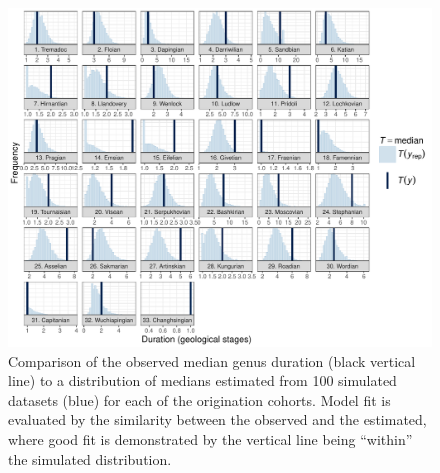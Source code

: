 \documentclass[11pt]{article}
\begin{document}
\begin{figure}[ht]
  \centering
  \includegraphics[height = 0.5\textheight,width=\textwidth,keepaspectratio=true]{figure/ppc_med_group_cweib_cens}
  \caption{ Comparison of the observed median genus duration (black vertical line) to a distribution of medians estimated from 100 simulated datasets (blue) for each of the origination cohorts. Model fit is evaluated by the similarity between the observed and the estimated, where good fit is demonstrated by the vertical line being ``within'' the simulated distribution. }
  \label{fig:group_median}
\end{figure}
\end{document}
